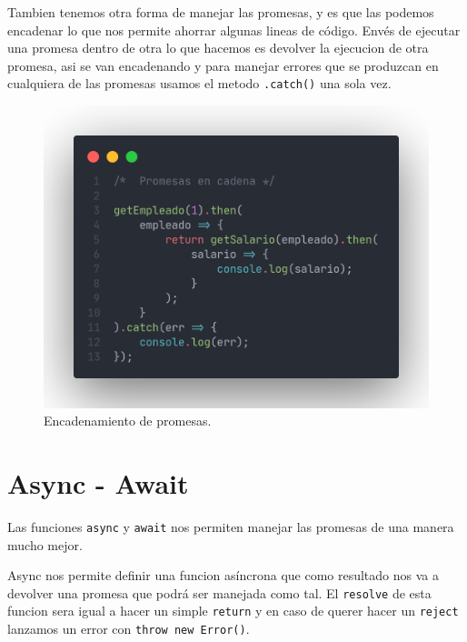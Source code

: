 \documentclass[12pt]{article}
\begin{document}
Tambien tenemos otra forma de manejar las promesas, y es que las podemos encadenar lo que nos permite ahorrar algunas lineas de código. Envés de ejecutar una promesa dentro de otra lo que hacemos es devolver la ejecucion de otra promesa, asi se van encadenando y para manejar errores que se produzcan en cualquiera de las promesas usamos el metodo \lstinline{.catch()} una sola vez.

\begin{figure}[H]
	\centering
	\includegraphics[scale=.24]{assets/images/promesas-3.png}
	\caption{Encadenamiento de promesas.}
\end{figure}
				
\section{Async - Await}

Las funciones \lstinline{async} y \lstinline{await} nos permiten manejar las promesas de una manera mucho mejor.

Async nos permite definir una funcion asíncrona que como resultado nos va a devolver una promesa que podrá ser manejada como tal. El \lstinline{resolve} de esta funcion sera igual a hacer un simple \lstinline{return} y en caso de querer hacer un \lstinline{reject} lanzamos un error con \lstinline{throw new Error()}.
\end{document}
